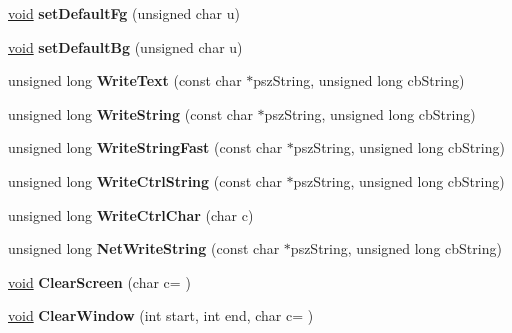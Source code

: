 \begin{DoxyCompactItemize}
\item 
\mbox{\label{class_t_console_a09fe72f37f040a00371a3b056bef601b}} 
\hyperlink{interfacevoid}{void} {\bfseries set\+Default\+Fg} (unsigned char u)
\item 
\mbox{\label{class_t_console_ac7d30130b42636a15aa0b879c1a6a4db}} 
\hyperlink{interfacevoid}{void} {\bfseries set\+Default\+Bg} (unsigned char u)
\item 
\mbox{\label{class_t_console_a9d9d78e14a2db76b145f2f314e8eed61}} 
unsigned long {\bfseries Write\+Text} (const char $\ast$psz\+String, unsigned long cb\+String)
\item 
\mbox{\label{class_t_console_a662f94c26a7916a437f830ef2204e696}} 
unsigned long {\bfseries Write\+String} (const char $\ast$psz\+String, unsigned long cb\+String)
\item 
\mbox{\label{class_t_console_aa9aafff45bc0749d4aa6d77f7d985dec}} 
unsigned long {\bfseries Write\+String\+Fast} (const char $\ast$psz\+String, unsigned long cb\+String)
\item 
\mbox{\label{class_t_console_a48d7b678d8d241e1a9802227f1caf71a}} 
unsigned long {\bfseries Write\+Ctrl\+String} (const char $\ast$psz\+String, unsigned long cb\+String)
\item 
\mbox{\label{class_t_console_a20d13e86aff57310410a3429e0e3944a}} 
unsigned long {\bfseries Write\+Ctrl\+Char} (char c)
\item 
\mbox{\label{class_t_console_afc1f3a908a2c392ff191a094693fce23}} 
unsigned long {\bfseries Net\+Write\+String} (const char $\ast$psz\+String, unsigned long cb\+String)
\item 
\mbox{\label{class_t_console_aeaa42aa4b98d863d1cf45907fe02f8d9}} 
\hyperlink{interfacevoid}{void} {\bfseries Clear\+Screen} (char c=\textquotesingle{} \textquotesingle{})
\item 
\mbox{\label{class_t_console_a6d9479bea5731c06d3f1d644f9c1d7cd}} 
\hyperlink{interfacevoid}{void} {\bfseries Clear\+Window} (int start, int end, char c=\textquotesingle{} \textquotesingle{})

\end{DoxyCompactItemize}
